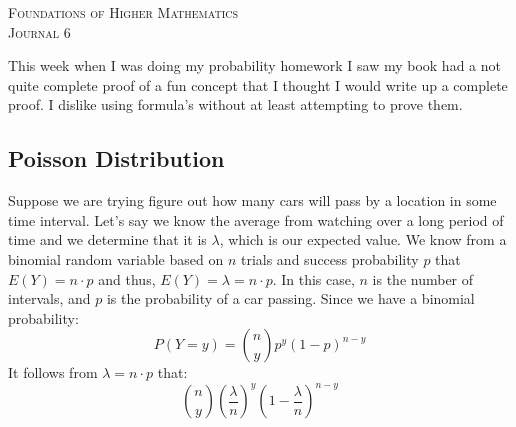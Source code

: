 \documentclass{article}
\begin{document}

\begin{center}
\textsc{\Large Foundations of Higher Mathematics}\\[.3cm]
\textsc{\Large Journal 6}\\[1cm]
\end{center}

This week when I was doing my probability homework I saw my book had a not quite complete proof of a fun concept that I thought I would write up a complete proof. I dislike using formula's without at least attempting to prove them.
\begin{multicols}{2}
\section*{Poisson Distribution}
Suppose we are trying figure out how many cars will pass by a location in some time interval. Let's say we know the average from watching over a long period of time and we determine that it is $\lambda$, which is our expected value. We know from a binomial random variable based on $n$ trials and success probability $p$ that $E(Y) = n \cdot p$ and thus, $E(Y) = \lambda = n \cdot p$. In this case, $n$ is the number of intervals, and $p$ is the probability of a car passing. Since we have a binomial probability:
$$
P(Y = y) = \displaystyle {n \choose y} p^y (1 - p)^{n-y}
$$
It follows from $\lambda = n \cdot p$ that:
$$
{n \choose y}%
%
\left( 
  \frac{\lambda}{n} 
\right)^{y}%
%
\left(
  1 - \frac{\lambda}{n}
\right)^{n-y}
$$


\end{multicols}
\end{document}
